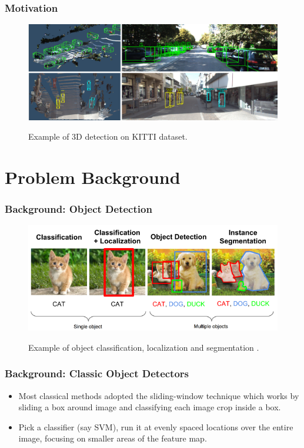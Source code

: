 \documentclass[10pt,fleqn,unknownkeysallowed]{beamer}
\begin{document}
\begin{frame}
	\frametitle{Motivation}
	\begin{figure}
		\begin{center}
			\includegraphics[width=1.0\textwidth]{images/Results_General}\\
			\caption{Example of 3D detection on KITTI dataset.}
		\end{center}
	\end{figure}
\end{frame}

\section{Problem Background}
\begin{frame}
	\frametitle{Background: Object Detection}
	\begin{figure}
		\begin{center}
			\includegraphics[width=1.0\textwidth]{images/LocalizationDetectionCuteness}\\
			\caption{Example of object classification, localization and segmentation \cite{object_det_cat}.}
		\end{center}
	\end{figure}
\end{frame}

\begin{frame}
	\frametitle{Background: Classic Object Detectors}
	\begin{itemize}
		\item{Most classical methods adopted the sliding-window technique which works by sliding a box around image and classifying each image
			crop inside a box.}
		\item{Pick a classifier (say SVM), run it at evenly spaced locations over the
			entire image, focusing on smaller areas of the feature map.}
	\end{itemize}
\end{frame}
\end{document}
